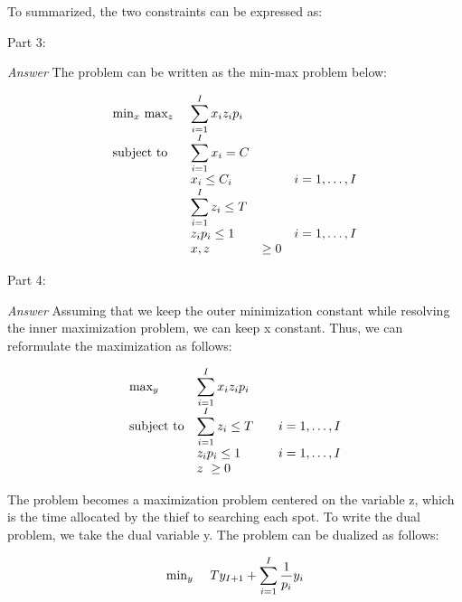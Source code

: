 \documentclass[10pt]{article}
\newenvironment{exercise}[2][Exercise]{\begin{trivlist}
  \item[\hskip \labelsep {\bfseries #1}\hskip \labelsep {\bfseries #2.}]}{\end{trivlist}}
\begin{document}
\begin{exercise}{5}
To summarized, the two constraints can be expressed as:


Part 3:

\textit{Answer}
The problem can be written as the min-max problem below:

\begin{equation}
\begin{array}{ll@{}lll}
\text{min}_x\ \text{max}_z\ && \displaystyle\sum\limits_{i=1}^{I} x_i z_i p_i\\

\text{subject to} 
&& \displaystyle\sum\limits_{i=1}^{I} x_i = C\\
&& x_i \leq C_i && i=1 ,\dots, I\\
&& \displaystyle\sum\limits_{i=1}^{I} z_i \leq T \\
                && z_i p_i \leq 1  &&  i=1 ,\dots, I\\
                && x,z &\geq 0\\ 



\end{array}
\end{equation}


Part 4:

\textit{Answer}
Assuming that we keep the outer minimization constant while resolving the inner maximization problem, we can keep x constant. Thus, we can reformulate the maximization as follows:

\begin{equation}
\begin{array}{ll@{}lll}
\text{max}_y\ && \displaystyle\sum\limits_{i=1}^{I} x_i z_i p_i\\

\text{subject to} 
&& \displaystyle\sum\limits_{i=1}^{I} z_i \leq T &&  i=1 ,\dots, I \\
                && z_i p_i \leq 1  &&  i=1 ,\dots, I\\
                && z\ \geq 0\\ 

\end{array}
\end{equation}

The problem becomes a maximization problem centered on the variable z, which is the time allocated by the thief to searching each spot.
To write the dual problem, we take the dual variable y. The problem can be dualized as follows:

\begin{equation}
\begin{array}{ll@{}lll}
\text{min}_y\ &&Ty_{I+1} + \displaystyle\sum\limits_{i=1}^{I} \frac{1}{p_i} y_i\\


\end{array}
\end{equation}
\end{exercise}
\end{document}
